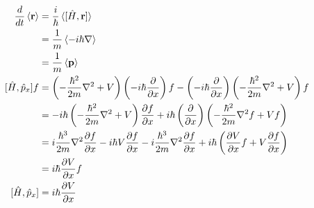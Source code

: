 \documentclass{article}
\renewcommand{\vec}[1]{\boldsymbol{\mathbf{#1}}}
\begin{document}
\begin{enumerate}
\begin{align*}
          \frac{d}{d t} \braket{\vec{r}} & = \frac{i}{\hbar} \braket{[\hat{H}, \vec{r}]}                                                                                                                                                                                                                                  \\
                                         & = \frac{1}{m} \braket{-i \hbar \nabla}                                                                                                                                                                                                                                         \\
                                         & = \frac{1}{m} \braket{\vec{p}}                                                                                                                                                                                                                                                 \\
          [\hat{H}, \hat{p}_x] f         & = \left( -\frac{\hbar^2}{2 m} \nabla^2 + V \right) \left( -i \hbar \frac{\partial}{\partial x} \right) f - \left( -i \hbar \frac{\partial}{\partial x} \right) \left( -\frac{\hbar^2}{2 m} \nabla^2 + V \right) f                                                              \\
                                         & = -i \hbar \left( -\frac{\hbar^2}{2 m} \nabla^2 + V \right) \frac{\partial f}{\partial x} + i \hbar \left( \frac{\partial}{\partial x} \right) \left( -\frac{\hbar^2}{2 m} \nabla^2 f + V f \right)                                                                            \\
                                         & = i \frac{\hbar^3}{2 m} \nabla^2 \frac{\partial f}{\partial x} - i \hbar V \frac{\partial f}{\partial x} - i \frac{\hbar^3}{2 m} \nabla^2 \frac{\partial f}{\partial x} + i \hbar \left( \frac{\partial V}{\partial x} f + V \frac{\partial f}{\partial x} \right)             \\
                                         & = i \hbar \frac{\partial V}{\partial x} f                                                                                                                                                                                                                                      \\
          [\hat{H}, \hat{p}_x]           & = i \hbar \frac{\partial V}{\partial x}                                                                                                                                                                                                                                        \\

\end{align*}
\end{enumerate}
\end{document}
